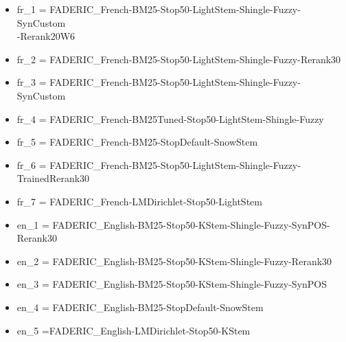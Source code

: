 \begin{itemize}
	\item fr\_1 = FADERIC\_French-BM25-Stop50-LightStem-Shingle-Fuzzy-SynCustom\\-Rerank20W6
	\item fr\_2 = FADERIC\_French-BM25-Stop50-LightStem-Shingle-Fuzzy-Rerank30
	\item fr\_3 = FADERIC\_French-BM25-Stop50-LightStem-Shingle-Fuzzy-SynCustom
	\item fr\_4 = FADERIC\_French-BM25Tuned-Stop50-LightStem-Shingle-Fuzzy
	\item fr\_5 = FADERIC\_French-BM25-StopDefault-SnowStem
	\item fr\_6 = FADERIC\_French-BM25-Stop50-LightStem-Shingle-Fuzzy-TrainedRerank30
	\item fr\_7 = FADERIC\_French-LMDirichlet-Stop50-LightStem
	\item en\_1 = FADERIC\_English-BM25-Stop50-KStem-Shingle-Fuzzy-SynPOS-Rerank30
	\item en\_2 = FADERIC\_English-BM25-Stop50-KStem-Shingle-Fuzzy-Rerank30
	\item en\_3 = FADERIC\_English-BM25-Stop50-KStem-Shingle-Fuzzy-SynPOS
	\item en\_4 = FADERIC\_English-BM25-StopDefault-SnowStem
	\item en\_5 =FADERIC\_English-LMDirichlet-Stop50-KStem
\end{itemize}

